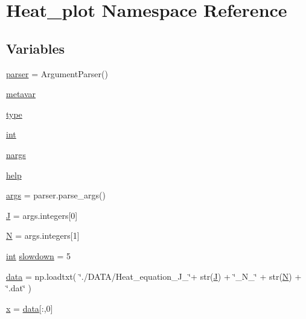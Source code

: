 \hypertarget{namespaceHeat__plot}{}\section{Heat\+\_\+plot Namespace Reference}
\label{namespaceHeat__plot}
\subsection*{Variables}
\begin{DoxyCompactItemize}
\item 
\hyperlink{namespaceHeat__plot_ab2e339067dfc8209cc8d2898d4207005}{parser} = Argument\+Parser()
\item 
\hyperlink{namespaceHeat__plot_aa83cfaa0b72d1fc27839aca50eaf9b68}{metavar}
\item 
\hyperlink{namespaceHeat__plot_ac6fe7a70a5ebe30ccb91e2255db50868}{type}
\item 
\hyperlink{namespaceHeat__plot_ac721620fed23609e47f849d804f29546}{int}
\item 
\hyperlink{namespaceHeat__plot_a2b3b44d5236c0a84aefd66e9fbd8f174}{nargs}
\item 
\hyperlink{namespaceHeat__plot_a01958ac77133cf99292b5a2cf0107f09}{help}
\item 
\hyperlink{namespaceHeat__plot_a91091fe60dbdb0842f9b23f99fab028b}{args} = parser.\+parse\+\_\+args()
\item 
\hyperlink{namespaceHeat__plot_a3cafcec38d886f33b35756791964bb58}{J} = args.\+integers\mbox{[}0\mbox{]}
\item 
\hyperlink{namespaceHeat__plot_a7d050092798e28458a263710837bda77}{N} = args.\+integers\mbox{[}1\mbox{]}
\item 
\hyperlink{namespaceHeat__plot_ac721620fed23609e47f849d804f29546}{int} \hyperlink{namespaceHeat__plot_a116214d215b6a0e66aefae82e2bbd4ef}{slowdown} = 5
\item 
\hyperlink{namespaceHeat__plot_a5f174ddffb3702db438b5922b832de2d}{data} = np.\+loadtxt( \char`\"{}./D\+A\+TA/Heat\+\_\+equation\+\_\+\+J\+\_\+\char`\"{}+ str(\hyperlink{namespaceHeat__plot_a3cafcec38d886f33b35756791964bb58}{J}) + \char`\"{}\+\_\+\+N\+\_\+\char`\"{} + str(\hyperlink{namespaceHeat__plot_a7d050092798e28458a263710837bda77}{N}) + \char`\"{}.dat\char`\"{} )
\item 
\hyperlink{namespaceHeat__plot_aa88370c16b85b784ccbde3ed88bc1991}{x} = \hyperlink{namespaceHeat__plot_a5f174ddffb3702db438b5922b832de2d}{data}\mbox{[}\+:,0\mbox{]}
\item 

\end{DoxyCompactItemize}
